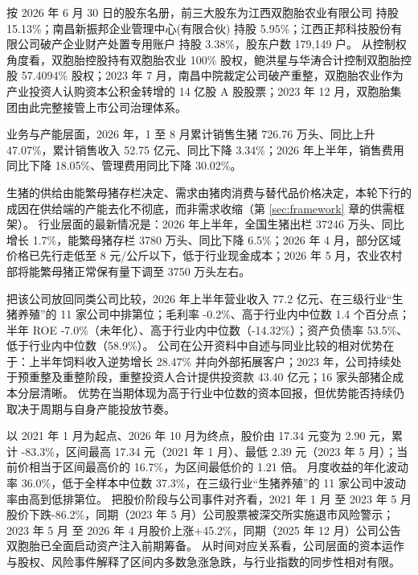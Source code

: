  按 2026 年 6 月 30 日的股东名册，前三大股东为江西双胞胎农业有限公司 持股 15.13\%；南昌新振邦企业管理中心(有限合伙) 持股 5.95\%；江西正邦科技股份有限公司破产企业财产处置专用账户 持股 3.38\%，股东户数 179,149 户。 从控制权角度看，双胞胎控股持有双胞胎农业 100\% 股权，鲍洪星与华涛合计控制双胞胎控股 57.4094\% 股权；2023 年 7 月，南昌中院裁定公司破产重整，双胞胎农业作为产业投资人认购资本公积金转增的 14 亿股 A 股股票；2023 年 12 月，双胞胎集团由此完整接管上市公司治理体系。

 业务与产能层面，2026 年，1 至 8 月累计销售生猪 726.76 万头、同比上升 47.07\%，累计销售收入 52.75 亿元、同比下降 3.34\%；2026 年上半年，销售费用同比下降 18.05\%、管理费用同比下降 30.02\%。

 生猪的供给由能繁母猪存栏决定、需求由猪肉消费与替代品价格决定，本轮下行的成因在供给端的产能去化不彻底，而非需求收缩（第 \ref{sec:framework} 章的供需框架）。 行业层面的最新情况是：2026 年上半年，全国生猪出栏 37246 万头、同比增长 1.7\%，能繁母猪存栏 3780 万头、同比下降 6.5\%；2026 年 4 月，部分区域价格已先行走低至 8 元/公斤以下，低于行业现金成本；2026 年 5 月，农业农村部将能繁母猪正常保有量下调至 3750 万头左右。

 把该公司放回同类公司比较，2026 年上半年营业收入 77.2 亿元、在三级行业“生猪养殖”的 11 家公司中排第位；毛利率 -0.2\%、高于行业内中位数 1.4 个百分点；半年 ROE -7.0\%（未年化）、高于行业内中位数（-14.32\%）；资产负债率 53.5\%、低于行业内中位数（58.9\%）。 公司在公开资料中自述与同业比较的相对优势在于：上半年饲料收入逆势增长 28.47\% 并向外部拓展客户；2023 年，公司持续处于预重整及重整阶段，重整投资人合计提供投资款 43.40 亿元；16 家头部猪企成本分层清晰。 优势在当期体现为高于行业中位数的资本回报，但优势能否持续仍取决于周期与自身产能投放节奏。

 以 2021 年 1 月为起点、2026 年 10 月为终点，股价由 17.34 元变为 2.90 元，累计 -83.3\%，区间最高 17.34 元（2021 年 1 月）、最低 2.39 元（2023 年 5 月）；当前价相当于区间最高价的 16.7\%，为区间最低价的 1.21 倍。 月度收益的年化波动率 36.0\%，低于全样本中位数 37.3\%，在三级行业“生猪养殖”的 11 家公司中波动率由高到低排第位。 把股价阶段与公司事件对齐看，2021 年 1 月 至 2023 年 5 月股价下跌-86.2\%，同期（2023 年 5 月）公司股票被深交所实施退市风险警示；2023 年 5 月 至 2026 年 4 月股价上涨+45.2\%，同期（2025 年 12 月）公司公告双胞胎已全面启动资产注入前期筹备。 从时间对应关系看，公司层面的资本运作与股权、风险事件解释了区间内多数急涨急跌，与行业指数的同步性相对有限。


